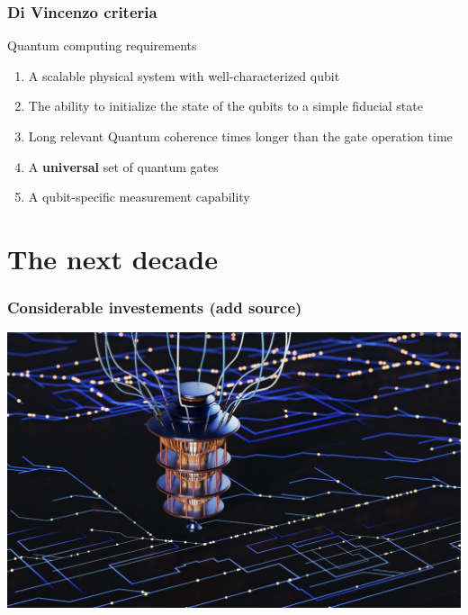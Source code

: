 \documentclass{beamer}
\begin{document}
\begin{frame}
\frametitle{Di Vincenzo criteria}

\begin{alertblock}{Quantum computing requirements }
\begin{enumerate}
\item A scalable physical system with well-characterized qubit

\item The ability to initialize the state of the qubits to a simple fiducial state

\item Long relevant Quantum coherence times longer than the gate operation time

\item A \textbf{universal} set of quantum gates

\item A qubit-specific measurement capability
\end{enumerate}

\noindent
\end{alertblock}
\end{frame}


\section{The next decade}

\begin{frame}
\frametitle{Considerable investements (add source)}


\centerline{\includegraphics[width=0.9\linewidth]{qcfigures/image1.png}}

\end{frame}
\end{document}
